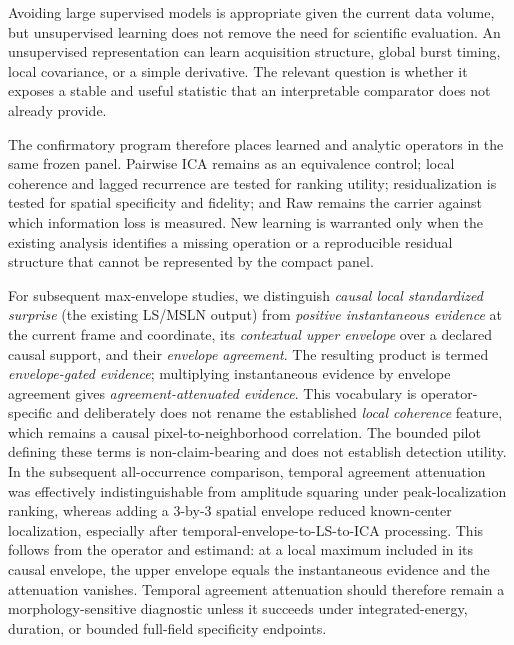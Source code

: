 Avoiding large supervised models is appropriate given the current data volume, but unsupervised learning does not remove the need for scientific evaluation. An unsupervised representation can learn acquisition structure, global burst timing, local covariance, or a simple derivative. The relevant question is whether it exposes a stable and useful statistic that an interpretable comparator does not already provide.

The confirmatory program therefore places learned and analytic operators in the same frozen panel. Pairwise ICA remains as an equivalence control; local coherence and lagged recurrence are tested for ranking utility; residualization is tested for spatial specificity and fidelity; and Raw remains the carrier against which information loss is measured. New learning is warranted only when the existing analysis identifies a missing operation or a reproducible residual structure that cannot be represented by the compact panel.

For subsequent max-envelope studies, we distinguish
\emph{causal local standardized surprise} (the existing LS/MSLN output) from
\emph{positive instantaneous evidence} at the current frame and coordinate,
its \emph{contextual upper envelope} over a declared causal support, and their
\emph{envelope agreement}. The resulting product is termed
\emph{envelope-gated evidence}; multiplying instantaneous evidence by envelope
agreement gives \emph{agreement-attenuated evidence}. This vocabulary is
operator-specific and deliberately does not rename the established
\emph{local coherence} feature, which remains a causal pixel-to-neighborhood
correlation. The bounded pilot defining these terms is non-claim-bearing and
does not establish detection utility. In the subsequent all-occurrence
comparison, temporal agreement attenuation was effectively indistinguishable
from amplitude squaring under peak-localization ranking, whereas adding a
3-by-3 spatial envelope reduced known-center localization, especially after
temporal-envelope-to-LS-to-ICA processing. This follows from the operator and
estimand: at a local maximum included in its causal envelope, the upper
envelope equals the instantaneous evidence and the attenuation vanishes.
Temporal agreement attenuation should therefore remain a morphology-sensitive
diagnostic unless it succeeds under integrated-energy, duration, or bounded
full-field specificity endpoints.

